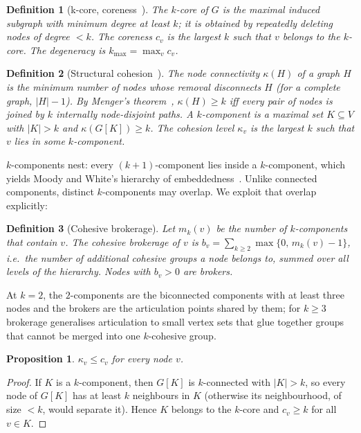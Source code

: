 \documentclass[conference]{IEEEtran}
\newtheorem{definition}{Definition}
\newtheorem{proposition}{Proposition}
\newcommand{\coh}{\kappa}
\newcommand{\cn}{c}
\begin{document}
\begin{definition}[k-core, coreness~\cite{seidman1983network}]
The $k$-core of $G$ is the maximal induced subgraph with minimum degree at least $k$; it is obtained by
repeatedly deleting nodes of degree $<k$. The \emph{coreness} $\cn_v$ is the largest $k$ such that $v$
belongs to the $k$-core. The \emph{degeneracy} is $k_{\max}=\max_v \cn_v$.
\end{definition}

\begin{definition}[Structural cohesion~\cite{moody2003structural,white2001cohesiveness}]
The node connectivity $\kappa(H)$ of a graph $H$ is the minimum number of nodes whose removal
disconnects $H$ (for a complete graph, $|H|-1$). By Menger's theorem~\cite{menger1927allgemeinen},
$\kappa(H)\ge k$ iff every pair of nodes is joined by $k$ internally node-disjoint paths. A
\emph{$k$-component} is a maximal set $K\subseteq V$ with $|K|>k$ and $\kappa(G[K])\ge k$. The
\emph{cohesion level} $\coh_v$ is the largest $k$ such that $v$ lies in some $k$-component.
\end{definition}

$k$-components nest: every $(k{+}1)$-component lies inside a $k$-component, which yields Moody and
White's hierarchy of embeddedness~\cite{moody2003structural}. Unlike connected components, distinct
$k$-components may overlap. We exploit that overlap explicitly:

\begin{definition}[Cohesive brokerage]
Let $m_k(v)$ be the number of $k$-components that contain $v$. The \emph{cohesive brokerage} of $v$ is
$b_v=\sum_{k\ge 2}\max\{0,\,m_k(v)-1\}$, i.e.\ the number of \emph{additional} cohesive groups a node
belongs to, summed over all levels of the hierarchy. Nodes with $b_v>0$ are \emph{brokers}.
\end{definition}

At $k=2$, the $2$-components are the biconnected components with at least three nodes and the brokers
are the articulation points shared by them; for $k\ge3$ brokerage generalises articulation to small
vertex sets that glue together groups that cannot be merged into one $k$-cohesive group.

\begin{proposition}\label{prop:le}
$\coh_v\le \cn_v$ for every node $v$.
\end{proposition}
\begin{proof}
If $K$ is a $k$-component, then $G[K]$ is $k$-connected with $|K|>k$, so every node of $G[K]$ has at
least $k$ neighbours in $K$ (otherwise its neighbourhood, of size $<k$, would separate it). Hence $K$
belongs to the $k$-core and $\cn_v\ge k$ for all $v\in K$.
\end{proof}
\end{document}
